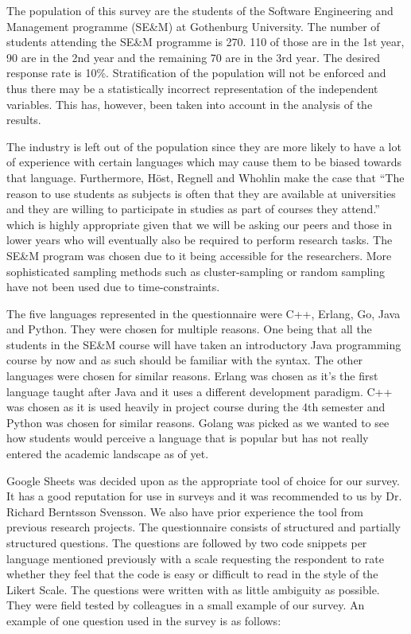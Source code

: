 \documentclass[times, 10pt,twocolumn]{IEEEtran}
\begin{document}
The population of this survey are the students of the Software Engineering and Management programme (SE\&M) at Gothenburg University. The number of students attending the SE\&M programme is 270. 110 of those are in the 1st year, 90 are in the 2nd year and the remaining 70 are in the 3rd year. The desired response rate is 10\%. Stratification of the population will not be enforced and thus there may be a statistically incorrect representation of the independent variables. This has, however, been taken into account in the analysis of the results. 
\newline

The industry is left out of the population since they are more likely to have a lot of experience with certain languages which may cause them to be biased towards that language. Furthermore, Höst, Regnell and Whohlin \cite{host2000using} make the case that ``The reason to use students as subjects is often that they are available at universities and they are willing to participate in studies as part of courses they attend.'' which is highly appropriate given that we will be asking our peers and those in lower years who will eventually also be required to perform research tasks. The SE\&M program was chosen due to it being accessible for the researchers. More sophisticated sampling methods such as cluster-sampling or random sampling have not been used due to time-constraints. 



The five languages represented in the questionnaire were C++, Erlang, Go, Java and Python. They were chosen for multiple reasons. One being that all the students in the SE\&M course will have taken an introductory Java programming course by now and as such should be familiar with the syntax. The other languages were chosen for similar reasons. Erlang was chosen as it's the first language taught after Java and it uses a different development paradigm. C++ was chosen as it is used heavily in project course during the 4th semester and Python was chosen for similar reasons. Golang was picked as we wanted to see how students would perceive a language that is popular but has not really entered the academic landscape as of yet.
\newline

Google Sheets was decided upon as the appropriate tool of choice for our survey. It has a good reputation for use in surveys and it was recommended to us by Dr. Richard Berntsson Svensson. We also have prior experience the tool from previous research projects.
The questionnaire consists of structured and partially structured questions. The questions are followed by two code snippets per language mentioned previously with a scale requesting the respondent to rate whether they feel that the code is easy or difficult to read in the style of the Likert Scale. The questions were written with as little ambiguity as possible. They were field tested by colleagues in a small example of our survey. An example of one question used in the survey is as follows:
\end{document}
